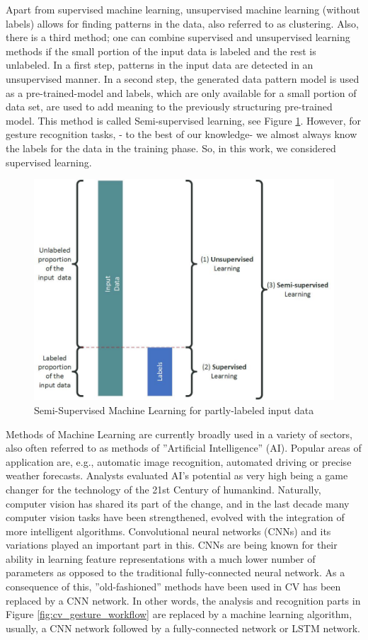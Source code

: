 Apart from supervised machine learning, unsupervised machine learning (without labels) allows for finding patterns in the data,  also referred to as clustering.  Also, there is a third method; one can combine supervised and unsupervised learning methods if the small portion of the input data is labeled and the rest is unlabeled.  In a first step, patterns in the input data  are detected  in an unsupervised manner.  In a second step, the generated data pattern model is used as a pre-trained-model and labels, which are only available for a small portion of data set,  are used to add meaning to the previously structuring pre-trained model.   This method is called Semi-supervised learning,  see Figure  \ref{fig:ssml}. However,  for gesture recognition tasks,  - to the best of our knowledge- we almost always know the labels for the data in the training phase.   So, in this work,  we considered supervised learning.\\
\begin{figure}[h]
	\centering
  \includegraphics[height=0.6\linewidth]{figures/ml_learnings}
  \caption{Semi-Supervised Machine Learning for partly-labeled input data}
  \label{fig:ssml}
\end{figure}

Methods of Machine Learning are currently broadly used in a variety of sectors, also often referred to as methods of ”Artificial  Intelligence”  (AI).   Popular areas of application are, e.g., automatic image recognition,  automated driving or precise weather forecasts. Analysts evaluated AI’s potential as very high being a game changer for the technology of the 21st Century of humankind.  Naturally, computer vision has shared its part of the change, and in the last decade many computer vision tasks have been strengthened, evolved with the integration of more intelligent algorithms.  Convolutional  neural networks (CNNs) and its variations played an important part in this.  CNNs are being known for their ability in learning feature representations with a much lower number of parameters as opposed to the traditional fully-connected neural network.   As a consequence of this,  ”old-fashioned”  methods have been used in CV has been replaced by a CNN network.  In other words, the analysis and recognition parts in Figure \ref{fig:cv_gesture_workflow} are replaced by a machine learning algorithm, usually, a CNN network followed by a fully-connected network or LSTM network.\\


